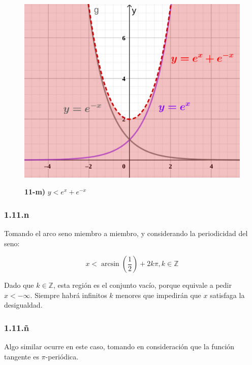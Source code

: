 \documentclass{article}
\renewcommand{\Bbb}{\mathbb}
\begin{document}
\begin{figure}[ht]
\caption{\textbf{11-m)} $y < e^x + e^{-x}$}
\includegraphics[scale=0.4]{img/ejercicios/1/11-m.png} 
\centering
\label{fig:1-11-m}
\end{figure}

\subsubsection*{1.11.n}
\label{subsubsec:1.11.n}

Tomando el arco seno miembro a miembro, y considerando la periodicidad del seno:

\begin{equation}
x < \arcsin \left( \frac{1}{2} \right) + 2 k \pi, k \in \Bbb Z
\end{equation}

Dado que $k \in \Bbb Z$, esta región es el conjunto vacío, porque equivale a pedir $x < -\infty$. Siempre habrá infinitos $k$ menores que impedirán que $x$ satisfaga la desigualdad.

\subsubsection*{1.11.ñ}
\label{subsubsec:1.11.ñ}

Algo similar ocurre en este caso, tomando en consideración que la función tangente es $\pi$-periódica. 
\end{document}
